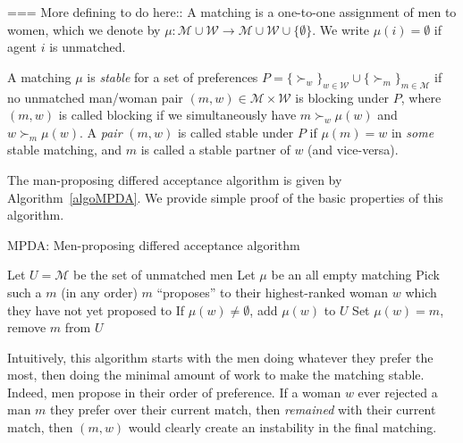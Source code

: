 \documentclass[12pt]{article}
\newcommand{\M}{\mathcal{M}}
\newcommand{\W}{\mathcal{W}}
\begin{document}
  === More defining to do here::
  A matching is a one-to-one assignment of men to women, which we denote
  by $\mu : \M\cup \W\to \M\cup \W\cup\{\emptyset\}$.
  We write $\mu(i) = \emptyset$ if
  agent $i$ is unmatched.

  A matching $\mu$ is \emph{stable} for a set of preferences 
  $P = \{\succ_w\}_{w\in\W} \cup \{\succ_m\}_{m\in\M}$
  if no unmatched man/woman pair 
  $(m,w)\in \M\times \W$ is blocking under $P$,
  where $(m,w)$ is called blocking if we simultaneously have
  $m \succ_w \mu(w)$ and $w \succ_m \mu(w)$.
  A \emph{pair} $(m,w)$ is called stable under $P$ if $\mu(m)=w$ in 
  \emph{some} stable matching,
  and $m$ is called a stable partner of $w$ (and vice-versa).

  The man-proposing differed acceptance algorithm is given by
  Algorithm~\ref{algoMPDA}. We provide simple proof of the basic properties of
  this algorithm.

  \begin{algorithm}
    \caption{MPDA: Men-proposing differed acceptance algorithm}
    \label{algoMPDA}
  \begin{algorithmic}[0]
    \State Let $U = \M$ be the set of unmatched men
    \State Let $\mu$ be an all empty matching
      \State Pick such a $m$ (in any order)
      \State $m$ ``proposes'' to their highest-ranked woman $w$ which 
        they have not yet proposed to
        \State If $\mu(w)\ne \emptyset$, add $\mu(w)$ to $U$
        \State Set $\mu(w) = m$, remove $m$ from $U$ 
      \EndIf
    \EndWhile
  \end{algorithmic}
  \end{algorithm}

  Intuitively, this algorithm starts with the men doing whatever they prefer
  the most, then doing the minimal amount of work to make the matching stable.
  Indeed, men propose in their order of preference. If a woman $w$ ever
  rejected a man $m$ they prefer over their current match,
  then \emph{remained} with their current match,
  then $(m,w)$ would clearly create an instability in the final matching.
\end{document}
